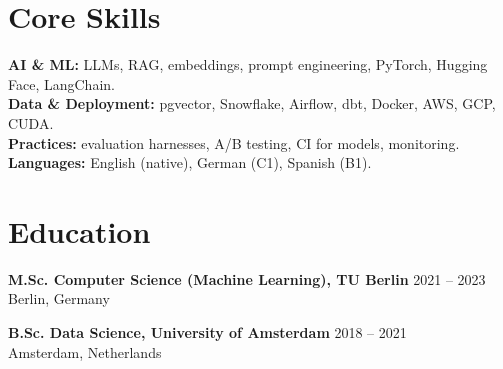 \documentclass[10pt,a4paper]{article}
\begin{document}
\section*{Core Skills}
\textbf{AI \& ML:} LLMs, RAG, embeddings, prompt engineering, PyTorch, Hugging Face, LangChain.\\
\textbf{Data \& Deployment:} pgvector, Snowflake, Airflow, dbt, Docker, AWS, GCP, CUDA.\\
\textbf{Practices:} evaluation harnesses, A/B testing, CI for models, monitoring.\\
\textbf{Languages:} English (native), German (C1), Spanish (B1).

\section*{Education}
\textbf{M.Sc. Computer Science (Machine Learning), TU Berlin} \hfill 2021 -- 2023\\
Berlin, Germany

\textbf{B.Sc. Data Science, University of Amsterdam} \hfill 2018 -- 2021\\
Amsterdam, Netherlands
\end{document}
